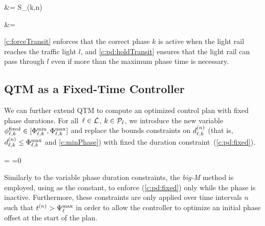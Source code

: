 \vspace{-2mm}
\noindent\begin{minipage}{0.5\linewidth}
\begin{cAlign} 
%
 &= S_{\ell}(k,n)
%
\end{cAlign}
\end{minipage}%
\begin{minipage}{0.5\linewidth}
\begin{cAlign} 
%
 &= 
%
\end{cAlign}
\end{minipage}\par\vspace{\belowdisplayskip}
%
\noindent \eqref{c:forceTransit} enforces that the correct phase $k$ is active
when the light rail reaches the traffic light $l$, and
%
%
\eqref{c:pd:holdTransit} ensures that the light rail can pass through $l$ even
if more than the maximum phase time  is necessary.


\subsection{QTM as a Fixed-Time Controller}

We can further extend QTM to compute an optimized control plan with fixed phase
durations.
%
For all~$\tl \in \Lset$, $k \in \Pset_\tl$, we introduce the new variable
$\PTFIXED{\ell}{k} \in [\PTMIN{\ell}{k}, \PTMAX{\ell}{k}]$ and replace the
bounds constraints on $\pd[n]{\ell}{k}$ (that is, $\pd[n]{\ell}{k} \le
\PTMAX{\ell}{k}$ and \ref{c:minPhase}) with fixed the duration
constraint~(\ref{c:pd:fixed}).
%
\begin{cAlign} 
%
 =   =0 
%
\end{cAlign}
%
Similarly to the variable phase duration constraints, the \textit{big-M} method
is employed, using  as the constant, to enforce (\ref{c:pd:fixed}) only while the
phase is inactive.
%
Furthermore, these constraints are only applied over time intervals $n$ such
that $\tn[n] > \CTMAX{\tl}$ in order to allow the controller to optimize an
initial phase offset at the start of the plan.



